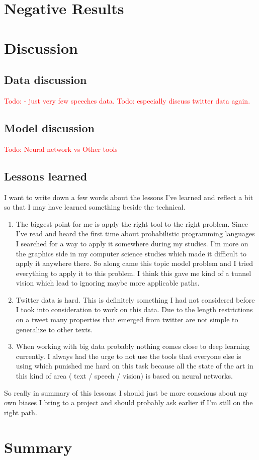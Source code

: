 \documentclass[10pt,conference,compsocconf]{IEEEtran}
\newcommand\todo[1]{\textcolor{red}{Todo: #1}}
\begin{document}
\section{Negative Results}


\section{Discussion}
\label{sec:Discussion}

\subsection{Data discussion}

\todo{- just very few speeches data. }
\todo{especially discuss twitter data again. }

\subsection{Model discussion}
\todo{Neural network vs Other tools}

\subsection{Lessons learned}
I want to write down a few words about the lessons I've learned and reflect a bit so that I may have learned something beside the technical. 
\begin{enumerate}
	\item The biggest point for me is apply the right tool to the right problem. Since I've read and heard the first time about probabilistic programming languages I searched for a way to apply it somewhere during my studies. I'm more on the graphics side in my computer science studies which made it difficult to apply it anywhere there. So along came this topic model problem and I tried everything to apply it to this problem. I think this gave me kind of a tunnel vision which lead to ignoring maybe more applicable paths.
	\item Twitter data is hard. This is definitely something I had not considered before I took into consideration to work on this data. Due to the length restrictions on a tweet many properties that emerged from twitter are not simple to generalize to other texts. 
	\item When working with big data probably nothing comes close to deep learning currently. I always had the urge to not use the tools that everyone else is using which punished me hard on this task because all the state of the art in this kind of area ( text / speech / vision) is based on neural networks. 
\end{enumerate}
So really in summary of this lessons: I should just be more conscious about my own biases I bring to a project and should probably ask earlier if I'm still on the right path. 


\section{Summary}
\label{sec:Summary}





\end{document}
